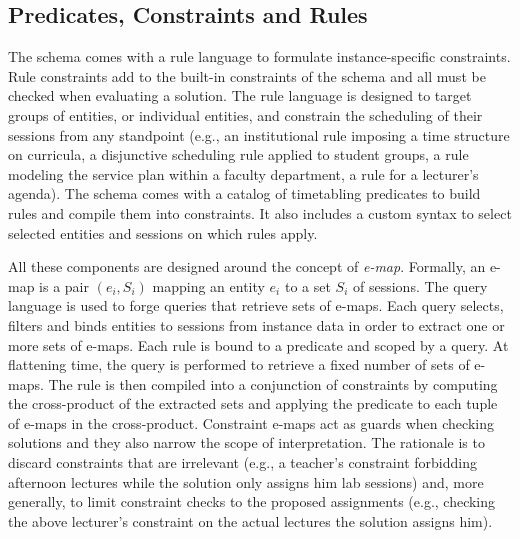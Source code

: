 \subsection{Predicates, Constraints and Rules}
\label{sec:schema-predicates-constraints-rules}

The \UTP{} schema comes with a rule language to formulate instance-specific constraints.
Rule constraints add to the built-in constraints of the schema
and all must be checked when evaluating a solution.
The rule language is designed to target groups of entities, or individual entities,
and constrain the scheduling of their sessions
from any standpoint
(e.g., an institutional rule imposing a time structure on curricula,
a disjunctive scheduling rule applied to student groups,
a rule modeling the service plan within a faculty department,
a rule for a lecturer's agenda).
The schema comes with a catalog of timetabling predicates
to build rules and compile them into constraints.
It also includes a custom syntax to select
selected entities and sessions on which rules apply.


All these components are designed around the concept of \textit{e-map}.
Formally, an e-map is a pair $(e_i,S_i)$ 
mapping an entity $e_i$ to a set $S_i$ of sessions.
The query language is used to forge queries that retrieve sets of e-maps.
Each query selects, filters and binds entities to sessions from instance data 
in order to extract one or more sets of e-maps.
Each rule is bound to a predicate and scoped by a query.
At flattening time, 
the query is performed to retrieve a fixed number of sets of e-maps.
The rule is then compiled into a conjunction of constraints
by computing the cross-product of the extracted sets %
and applying the predicate to each tuple of e-maps in the cross-product.
Constraint e-maps act as guards when checking solutions
and they also narrow the scope of interpretation.
The rationale is to discard constraints that are irrelevant
(e.g., a teacher's constraint forbidding afternoon lectures while the solution only assigns him lab sessions)
and, more generally, to limit constraint checks to the proposed assignments
(e.g., checking the above lecturer's constraint on the actual lectures the solution assigns him).

